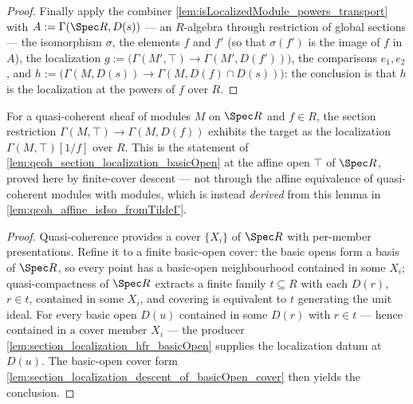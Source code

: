 \begin{proof}
  Finally apply the combiner \cref{lem:isLocalizedModule_powers_transport} with
  \(A := \Gamma(\Spec R, D(s))\) — an \(R\)-algebra through restriction of global
  sections — the isomorphism \(\sigma\), the elements \(f\) and \(f'\) (so that
  \(\sigma(f')\) is the image of \(f\) in \(A\)), the localization
  \(g := \bigl(\Gamma(M', \top) \to \Gamma(M', D(f'))\bigr)\), the comparisons
  \(e_1, e_2\), and \(h := \bigl(\Gamma(M, D(s)) \to \Gamma(M, D(f) \cap D(s))\bigr)\):
  the conclusion is that \(h\) is the localization at the powers of \(f\) over \(R\).
\end{proof}

\begin{lemma}
  \label{lem:section_localization_descent}
  \leanok
  For a quasi-coherent sheaf of modules \(M\) on \(\Spec R\) and \(f \in R\), the section
  restriction \(\Gamma(M, \top) \to \Gamma(M, D(f))\) exhibits the target as the
  localization \(\Gamma(M, \top)[1/f]\) over \(R\). This is the statement of
  \cref{lem:qcoh_section_localization_basicOpen} at the affine open \(\top\) of
  \(\Spec R\), proved here by finite-cover descent --- not through the affine
  equivalence of quasi-coherent modules with modules, which is instead \emph{derived}
  from this lemma in \cref{lem:qcoh_affine_isIso_fromTildeΓ}.
\end{lemma}
\begin{proof}
  \leanok
  Quasi-coherence provides a cover \(\{X_i\}\) of \(\Spec R\) with per-member
  presentations. Refine it to a finite basic-open cover: the basic opens form a basis of
  \(\Spec R\), so every point has a basic-open neighbourhood contained in some \(X_i\);
  quasi-compactness of \(\Spec R\) extracts a finite family \(t \subseteq R\) with each
  \(D(r)\), \(r \in t\), contained in some \(X_i\), and covering is equivalent to \(t\)
  generating the unit ideal. For every basic open \(D(u)\) contained in some \(D(r)\)
  with \(r \in t\) — hence contained in a cover member \(X_i\) — the producer
  \cref{lem:section_localization_hfr_basicOpen} supplies the localization datum at
  \(D(u)\). The basic-open cover form
  \cref{lem:section_localization_descent_of_basicOpen_cover} then yields the conclusion.
\end{proof}


